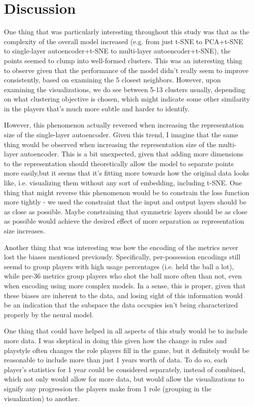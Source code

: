 \documentclass[12pt]{article}
\begin{document}
    \section{Discussion}
    One thing that was particularly interesting throughout this study was that as the complexity of the overall model increased (e.g. from just t-SNE to PCA+t-SNE to single-layer autoencoder+t-SNE to multi-layer autoencoder+t-SNE), the points seemed to clump into well-formed clusters. This was an interesting thing to observe given that the performance of the model didn't really seem to improve consistently, based on examining the 5 closest neighbors. However, upon examining the visualizations, we do see between 5-13 clusters usually, depending on what clustering objective is chosen, which might indicate some other similarity in the players that's much more subtle and harder to identify.

    However, this phenomenon actually reversed when increasing the representation size of the single-layer autoencoder. Given this trend, I imagine that the same thing would be observed when increasing the representation size of the multi-layer autoencoder. This is a bit unexpected, given that adding more dimensions to the representation should theoretically allow the model to separate points more easily,but it seems that it's fitting more towards how the original data looks like, i.e. visualizing them without any sort of embedding, including t-SNE. One thing that might reverse this phenomenon would be to constrain the loss function more tightly - we used the constraint that the input and output layers should be as close as possible. Maybe constraining that symmetric layers should be as close as possible would achieve the desired effect of more separation as representation size increases.

    Another thing that was interesting was how the encoding of the metrics never lost the biases mentioned previously. Specifically, per-possession encodings still seemd to group players with high usage percentages (i.e. held the ball a lot), while per-36 metrics group players who shot the ball more often than not, even when encoding using more complex models. In a sense, this is proper, given that these biases are inherent to the data, and losing sight of this information would be an indication that the subspace the data occupies isn't being characterized properly by the neural model.

    One thing that could have helped in all aspects of this study would be to include more data. I was skeptical in doing this given how the change in rules and playstyle often changes the role players fill in the game, but it definitely would be reasonable to include more than just 1 years worth of data. To do so, each player's statistics for 1 year could be considered separately, instead of combined, which not only would allow for more data, but would allow the visualizations to signify any progression the players make from 1 role (grouping in the visualization) to another.
\end{document}
